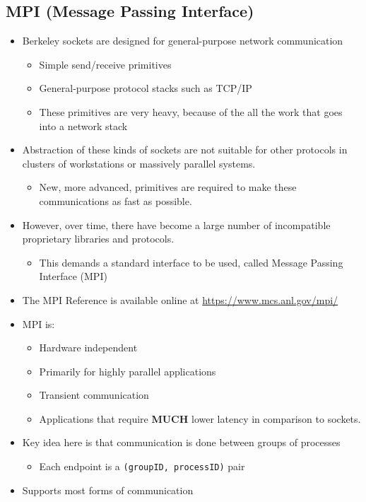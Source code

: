 \subsection{MPI (Message Passing Interface)}\label{subsec:Message_Passing_Interface}
\begin{itemize}[noitemsep]
\item Berkeley sockets are designed for general-purpose network communication
  \begin{itemize}[noitemsep]
  \item Simple send/receive primitives
  \item General-purpose protocol stacks such as TCP/IP
  \item These primitives are very heavy, because of the all the work that goes into a network stack
  \end{itemize}
\item Abstraction of these kinds of sockets are not suitable for other protocols in clusters of workstations or massively parallel systems.
  \begin{itemize}[noitemsep]
  \item New, more advanced, primitives are required to make these communications as fast as possible.
  \end{itemize}
\item However, over time, there have become a large number of incompatible proprietary libraries and protocols.
  \begin{itemize}[noitemsep]
  \item This demands a standard interface to be used, called Message Passing Interface (MPI)
  \end{itemize}
\item The MPI Reference is available online at \url{https://www.mcs.anl.gov/mpi/}
\item MPI is:
  \begin{itemize}[noitemsep]
  \item Hardware independent
  \item Primarily for highly parallel applications
  \item Transient communication
  \item Applications that require \textbf{MUCH} lower latency in comparison to sockets.
  \end{itemize}
\item Key idea here is that communication is done between groups of processes
  \begin{itemize}[noitemsep]
  \item Each endpoint is a \texttt{(groupID, processID)} pair
  \end{itemize}
\item Supports most forms of communication
\end{itemize}


